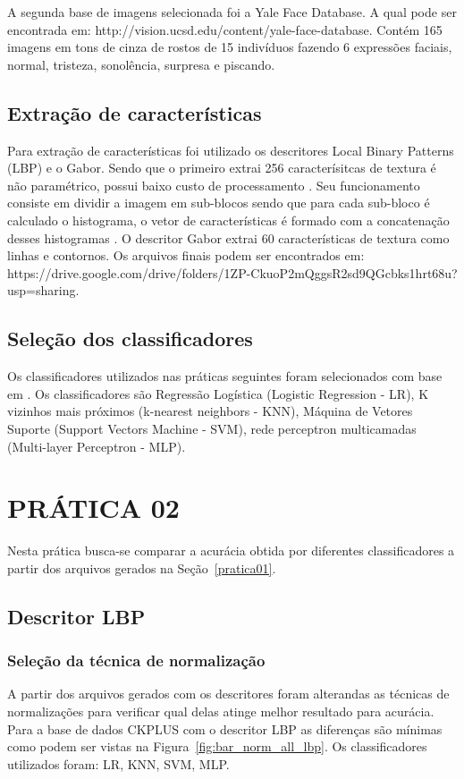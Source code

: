 \documentclass[a4paper, 12 pt, conference]{ieeeconf}  %
\begin{document}
A segunda base de imagens selecionada foi a Yale Face Database. A qual pode ser encontrada em: http://vision.ucsd.edu/content/yale-face-database. Contém 165 imagens em tons de cinza de rostos de 15 indivíduos fazendo 6 expressões faciais, normal, tristeza, sonolência, surpresa e piscando.

\subsection{Extração de características}
Para extração de características foi utilizado os descritores Local Binary Patterns (LBP) e o Gabor. Sendo que o primeiro extrai 256 caracterísitcas de textura é não paramétrico, possui baixo custo de processamento \cite{rajan:19}. Seu funcionamento consiste em dividir a imagem em sub-blocos sendo que para cada sub-bloco é calculado o histograma, o vetor de características é formado com a concatenação desses histogramas \cite{rajan:19}. O descritor Gabor extrai 60 características de textura como linhas e contornos. Os arquivos finais podem ser encontrados em: https://drive.google.com/drive/folders/1ZP-CkuoP2mQggsR2sd9QGcbks1hrt68u?usp=sharing.

\subsection{Seleção dos classificadores}
Os classificadores utilizados nas práticas seguintes foram selecionados com base em \cite{rajan:19}. Os classificadores são Regressão Logística (Logistic Regression - LR), K vizinhos mais próximos (k-nearest neighbors - KNN), Máquina de Vetores Suporte (Support Vectors Machine - SVM), rede perceptron multicamadas (Multi-layer Perceptron - MLP).

\section{PRÁTICA 02}
\label{pratica02}
Nesta prática busca-se comparar a acurácia obtida por diferentes classificadores a partir dos arquivos gerados na Seção~\ref{pratica01}.

\subsection{Descritor LBP}
\subsubsection{Seleção da técnica de normalização}
A partir dos arquivos gerados com os descritores foram alterandas as técnicas de normalizações para verificar qual delas atinge melhor resultado para acurácia. Para a base de dados CKPLUS com o descritor LBP as diferenças são mínimas como podem ser vistas na Figura~\ref{fig:bar_norm_all_lbp}. Os classificadores utilizados foram: LR, KNN, SVM, MLP.
\end{document}
